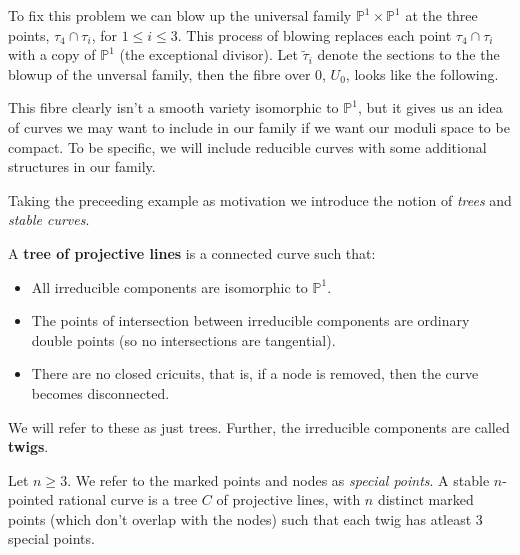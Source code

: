 \begin{example}
    \par To fix this problem we can blow up the universal family $\mathbb{P}^{1} \times \mathbb{P}^{1}$ at the three points, $\tau_{4}\cap \tau_{i}$, for $1\leq i \leq 3$.
    This process of blowing replaces each point $\tau_{4}\cap \tau_{i}$ with a copy of $\mathbb{P}^{1}$ (the exceptional divisor).
    Let $\tilde{\tau}_{i}$ denote the sections to the the blowup of the unversal family, then the fibre over $0$, $U_{0}$, looks like the following.
    \begin{center}
    \end{center}
    This fibre clearly isn't a smooth variety isomorphic to $\mathbb{P}^{1}$, but it gives us an idea of curves we may want to include in our family if we want our moduli space to be compact. 
    To be specific, we will include reducible curves with some additional structures in our family.
\end{example}
Taking the preceeding example as motivation we introduce the notion of \textit{trees} and \textit{stable curves}.
\begin{definition}
    A \textbf{tree of projective lines} is a connected curve such that:
    \begin{itemize}
        \item All irreducible components are isomorphic to $\mathbb{P}^{1}$.
        \item The points of intersection between irreducible components are ordinary double points (so no intersections are tangential).
        \item There are no closed cricuits, that is, if a node is removed, then the curve becomes disconnected.
    \end{itemize}
    We will refer to these as just trees.
    Further, the irreducible components are called \textbf{twigs}.
\end{definition}
\begin{definition}
    Let $n  \geq 3$. 
    We refer to the marked points and nodes as \textit{special points}.
    A stable $n$-pointed rational curve is a tree $C$ of projective lines, with $n$ distinct marked points (which don't overlap with the nodes) such that each twig has atleast $3$ special points. 
\end{definition}

